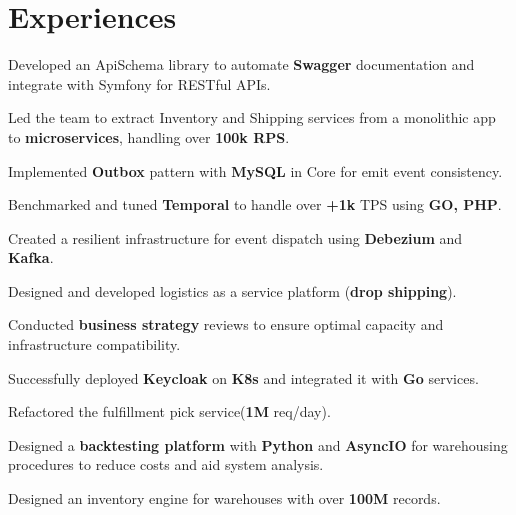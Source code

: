 \documentclass[]{plushcv}
\begin{document}
\begin{minipage}[t]{0.70\textwidth}
\section{Experiences}
\vspace{5pt} %
\begin{tightemize}
\sectionsep
\item Developed an ApiSchema library to automate \textbf{Swagger} documentation and integrate with Symfony for RESTful APIs.
\item Led the team to extract Inventory and Shipping services from a monolithic app to \textbf{microservices}, handling over \textbf{100k RPS}.
\item Implemented \textbf{Outbox} pattern with \textbf{MySQL} in Core for emit event consistency.
\item Benchmarked and tuned \textbf{Temporal} to handle over \textbf{+1k} TPS using \textbf{GO, PHP}.
\item Created a resilient infrastructure for event dispatch using \textbf{Debezium} and \textbf{Kafka}.
\item Designed and developed logistics as a service platform (\textbf{drop shipping}).
\item Conducted \textbf{business strategy} reviews to ensure optimal capacity and infrastructure compatibility.
\item Successfully deployed \textbf{Keycloak} on \textbf{K8s} and integrated it with \textbf{Go} services.
\end{tightemize}
\vspace{5pt} %
\begin{tightemize}
\item Refactored the fulfillment pick service(\textbf{1M} req/day).
\item Designed a \textbf{backtesting platform} with \textbf{Python} and \textbf{AsyncIO} for warehousing procedures to reduce costs and aid system analysis.
\item Designed an inventory engine for warehouses with over \textbf{100M} records.
\end{tightemize}


\end{minipage}
\end{document}
